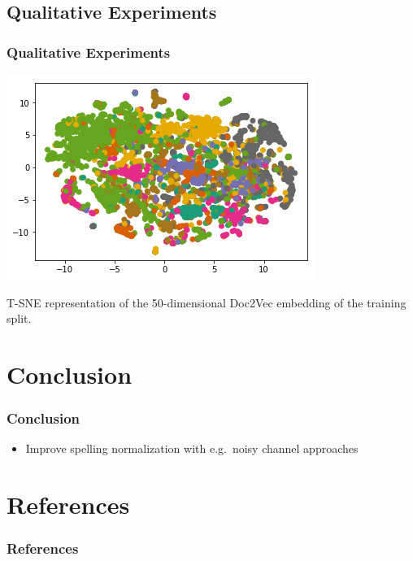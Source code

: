 \documentclass{beamer}
\begin{document}
\subsection{Qualitative Experiments}

\begin{frame}
\frametitle{Qualitative Experiments}

\centering
\includegraphics[width=.7\linewidth]{images/embedding}

T-SNE representation of the 50-dimensional Doc2Vec embedding of the training split.

\end{frame}

\section{Conclusion}

\begin{frame}
\frametitle{Conclusion}

\begin{itemize}
\item Improve spelling normalization with e.g.~noisy channel approaches \cite{kernighan1990spelling}
\end{itemize}

\end{frame}

\section*{References}

\begin{frame}
\frametitle{References}
{\tiny

}
\end{frame}
 
\end{document}
